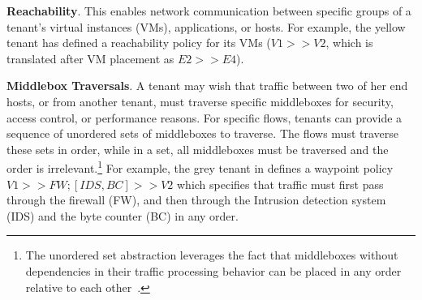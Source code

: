 


\begin{compactitemize}
\item \textbf{Reachability}. This enables network communication
  between specific groups of a tenant's virtual instances (VMs),
  applications, or hosts. For example, the yellow tenant has defined a
  reachability policy for its VMs ($V1 >> V2$, which is translated
  after VM placement as $E2 >> E4$).
\item \textbf{Middlebox Traversals}. A tenant may wish that traffic
  between two of her end hosts, or from another tenant, must traverse
  specific middleboxes for %
  security, access control, or performance reasons. For specific
  flows, tenants can provide a sequence of unordered sets of
  middleboxes
  to traverse. The flows must traverse these sets in order, while in a
  set, all middleboxes must be traversed and the order is
  irrelevant.\footnote{The unordered set abstraction leverages the
    fact that middleboxes without dependencies in their traffic
    processing behavior can be placed in any order relative to each
    other~\cite{pga}.} For example, the grey tenant in
   defines a waypoint policy $V1 >> FW;
       [IDS,BC] >> V2$ which specifies that traffic must first pass
       through the firewall (FW), and then through 
       the Intrusion detection system (IDS) and the
       byte counter (BC) in any order.



\end{compactitemize}
